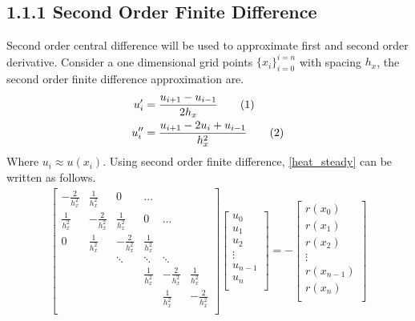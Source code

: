 \documentclass[11pt, letterpaper, hidelinks]{article}
\theoremstyle{definition}
\newcommand\numberthis{\addtocounter{equation}{1}\tag{\theequation}}
\begin{document}
\subsection{1.1.1 Second Order Finite Difference }

Second order central difference will be used to approximate first and second order derivative. Consider a one dimensional grid points $\{x_i\}_{i=0}^{i=n}$ with spacing $h_x$, the second order finite difference approximation are.
\begin{align*}
    u^\prime_i         & = \frac{u_{i+1}-u_{i-1}}{2h_x}  \numberthis \label{fd1}         \\
    u^{\prime\prime}_i & = \frac{u_{i+1} -2u_i + u_{i-1}}{h_x^2} \numberthis \label{fd2}
\end{align*}
Where $u_i \approx u(x_i)$. Using second order finite difference, \eqref{heat_steady} can be written as follows.
\begin{align*}
    \left[
        \begin{array}{cccccc}
            -\frac{2}{h_x^2} & \frac{1}{h_x^2}  & 0                & ...             &                  &                  \\
            \frac{1}{h_x^2}  & -\frac{2}{h_x^2} & \frac{1}{h_x^2}  & 0               & ...              &                  \\
            0                & \frac{1}{h_x^2}  & -\frac{2}{h_x^2} & \frac{1}{h_x^2} &                  &                  \\
                             &                  & \ddots           & \ddots          & \ddots           &                  \\
                             &                  &                  & \frac{1}{h_x^2} & -\frac{2}{h_x^2} & \frac{1}{h_x^2}  \\
                             &                  &                  &                 & \frac{1}{h_x^2}  & -\frac{2}{h_x^2} \\
        \end{array}
        \right]
    \left[
        \begin{array}{cccccc}
            u_0 \\ u_1 \\ u_2 \\ \vdots \\ u_{n-1} \\ u_{n} \\
        \end{array}
        \right]
    = -
    \left[
        \begin{array}{cccccc}
            r(x_0) \\ r(x_1) \\ r(x_2) \\ \vdots \\ r(x_{n-1}) \\ r(x_{n}) \\
        \end{array}
        \right]
\end{align*}
\end{document}
